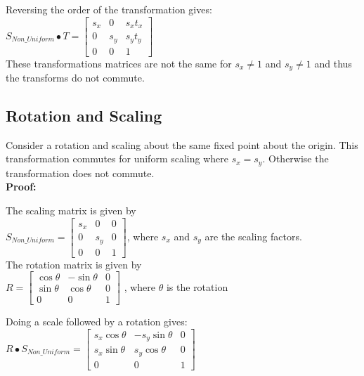 \documentclass[a4paper,10pt]{scrartcl}
\begin{document}
Reversing the order of the transformation gives: \\

$S_{Non\_Uniform} \bullet T = \begin{bmatrix}
		  s_x & 0 & s_xt_x \\
		  0 & s_y & s_yt_y \\
		  0 & 0 & 1
               \end{bmatrix}
$ \\ 

These transformations matrices are not the same for $s_x \neq 1$ and $s_y \neq 1$ and thus the transforms do not commute.

\subsection{Rotation and Scaling}

Consider a rotation and scaling about the same fixed point about the origin. This transformation commutes for uniform scaling where $s_x = s_y$. Otherwise the transformation does not commute.\\

{\bfseries Proof:}

The scaling matrix is given by \\

$S_{Non\_Uniform} = \begin{bmatrix}
    s_x       & 0 & 0 \\
    0       & s_y & 0 \\
    0       & 0 & 1     
 \end{bmatrix}
$, where $s_x$ and $s_y$ are the scaling factors. \\

The rotation matrix is given by \\

$R = \begin{bmatrix}
      \cos{\theta}       & -\sin{\theta} & 0 \\
      \sin{\theta}       & \cos{\theta} & 0 \\
      0       & 0 & 1             
     \end{bmatrix}
$   , where $\theta$ is the rotation

Doing a scale followed by a rotation gives: \\

$R \bullet S_{Non\_Uniform} = \begin{bmatrix}
		  s_x\cos{\theta} & -s_y\sin{\theta} & 0 \\
		  s_x\sin{\theta} & s_y\cos{\theta} & 0 \\
		  0 & 0 & 1
               \end{bmatrix}
$ \\
\end{document}
